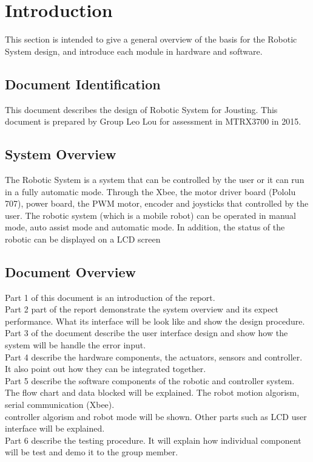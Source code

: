 \documentclass[MTRX3700report.tex]{subfiles}
\begin{document}
\section{Introduction}
This section is intended to give a general overview of the basis for the Robotic System design, and introduce each module in hardware and software.
\subsection{Document Identification}
This document describes the design of Robotic System for Jousting. This document is prepared by Group Leo Lou for assessment in MTRX3700 in 2015.
\subsection{System Overview}
The Robotic System is a system that can be controlled by the user or it can run in a fully automatic mode. Through the Xbee, the motor driver board (Pololu 707), power board, the PWM motor, encoder and joysticks that controlled by the user. The robotic system (which is a mobile robot) can be operated in manual mode, auto assist mode and automatic mode. In addition, the status of the robotic can be displayed on a LCD screen

\subsection{Document Overview}  

Part 1 of this document is an introduction of the report.\\
Part 2 part of the report demonstrate the system overview and its expect performance. What its interface will be look like and show the design procedure.\\
Part 3 of the document describe the user interface design and show how the system will be handle the error input.\\
Part 4 describe the hardware components, the actuators, sensors and controller. It also point out how they can be integrated together.\\
Part 5 describe the software components of the robotic and controller system. The flow chart and data blocked will be explained. The robot motion algorism, serial communication (Xbee).\\ controller algorism and robot mode will be shown. Other parts such as LCD user interface will be explained.\\
Part 6 describe the testing procedure. It will explain how individual component will be test and demo it to the group member.\\
\end{document}
